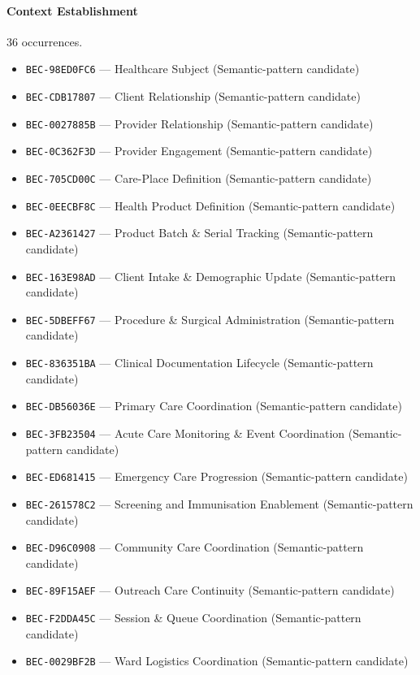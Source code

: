\documentclass[11pt,a4paper,openany]{book}
\begin{document}
\paragraph{Context Establishment} 36 occurrences.\par
\begin{itemize}
\item \texttt{BEC-98ED0FC6} --- Healthcare Subject (Semantic-pattern candidate)
\item \texttt{BEC-CDB17807} --- Client Relationship (Semantic-pattern candidate)
\item \texttt{BEC-0027885B} --- Provider Relationship (Semantic-pattern candidate)
\item \texttt{BEC-0C362F3D} --- Provider Engagement (Semantic-pattern candidate)
\item \texttt{BEC-705CD00C} --- Care-Place Definition (Semantic-pattern candidate)
\item \texttt{BEC-0EECBF8C} --- Health Product Definition (Semantic-pattern candidate)
\item \texttt{BEC-A2361427} --- Product Batch \& Serial Tracking (Semantic-pattern candidate)
\item \texttt{BEC-163E98AD} --- Client Intake \& Demographic Update (Semantic-pattern candidate)
\item \texttt{BEC-5DBEFF67} --- Procedure \& Surgical Administration (Semantic-pattern candidate)
\item \texttt{BEC-836351BA} --- Clinical Documentation Lifecycle (Semantic-pattern candidate)
\item \texttt{BEC-DB56036E} --- Primary Care Coordination (Semantic-pattern candidate)
\item \texttt{BEC-3FB23504} --- Acute Care Monitoring \& Event Coordination (Semantic-pattern candidate)
\item \texttt{BEC-ED681415} --- Emergency Care Progression (Semantic-pattern candidate)
\item \texttt{BEC-261578C2} --- Screening and Immunisation Enablement (Semantic-pattern candidate)
\item \texttt{BEC-D96C0908} --- Community Care Coordination (Semantic-pattern candidate)
\item \texttt{BEC-89F15AEF} --- Outreach Care Continuity (Semantic-pattern candidate)
\item \texttt{BEC-F2DDA45C} --- Session \& Queue Coordination (Semantic-pattern candidate)
\item \texttt{BEC-0029BF2B} --- Ward Logistics Coordination (Semantic-pattern candidate)

\end{itemize}
\end{document}
